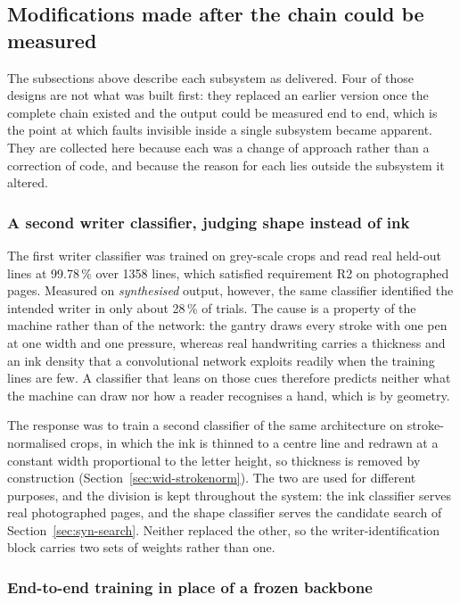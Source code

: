 \subsection{Modifications made after the chain could be measured}
\label{sec:later}

The subsections above describe each subsystem as delivered. Four of those designs are not what was built first: they replaced an earlier version once the complete chain existed and the output could be measured end to end, which is the point at which faults invisible inside a single subsystem became apparent. They are collected here because each was a change of approach rather than a correction of code, and because the reason for each lies outside the subsystem it altered.

\subsubsection{A second writer classifier, judging shape instead of ink}
\label{sec:later-strokenorm}

The first writer classifier was trained on grey-scale crops and read real held-out lines at 99.78\,\% over 1358 lines, which satisfied requirement R2 on photographed pages. Measured on \emph{synthesised} output, however, the same classifier identified the intended writer in only about 28\,\% of trials. The cause is a property of the machine rather than of the network: the gantry draws every stroke with one pen at one width and one pressure, whereas real handwriting carries a thickness and an ink density that a convolutional network exploits readily when the training lines are few. A classifier that leans on those cues therefore predicts neither what the machine can draw nor how a reader recognises a hand, which is by geometry.

The response was to train a second classifier of the same architecture on stroke-normalised crops, in which the ink is thinned to a centre line and redrawn at a constant width proportional to the letter height, so thickness is removed by construction (Section~\ref{sec:wid-strokenorm}). The two are used for different purposes, and the division is kept throughout the system: the ink classifier serves real photographed pages, and the shape classifier serves the candidate search of Section~\ref{sec:syn-search}. Neither replaced the other, so the writer-identification block carries two sets of weights rather than one.

\subsubsection{End-to-end training in place of a frozen backbone}
\label{sec:later-endtoend}

